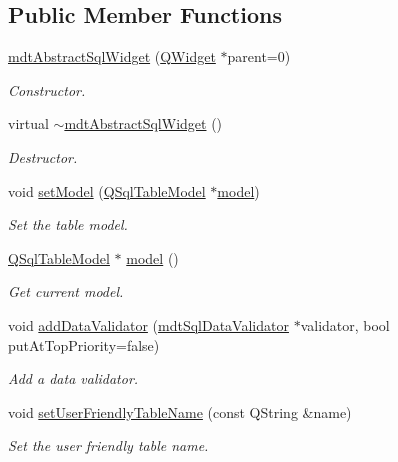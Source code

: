 \subsection*{Public Member Functions}
\begin{DoxyCompactItemize}
\item 
\hyperlink{classmdt_abstract_sql_widget_a74ef509a9487c3985fce7a4cbadbe1b3}{mdt\-Abstract\-Sql\-Widget} (\hyperlink{class_q_widget}{Q\-Widget} $\ast$parent=0)
\begin{DoxyCompactList}\small\item\em Constructor. \end{DoxyCompactList}\item 
virtual \hyperlink{classmdt_abstract_sql_widget_a46dabe9e76aaea93ff20b28863e6c0ff}{$\sim$mdt\-Abstract\-Sql\-Widget} ()
\begin{DoxyCompactList}\small\item\em Destructor. \end{DoxyCompactList}\item 
void \hyperlink{classmdt_abstract_sql_widget_a8971862741e1ef79c79e11b37e955476}{set\-Model} (\hyperlink{class_q_sql_table_model}{Q\-Sql\-Table\-Model} $\ast$\hyperlink{classmdt_abstract_sql_widget_a298d40a6540aeabbb7644e3c4fd9f3ea}{model})
\begin{DoxyCompactList}\small\item\em Set the table model. \end{DoxyCompactList}\item 
\hyperlink{class_q_sql_table_model}{Q\-Sql\-Table\-Model} $\ast$ \hyperlink{classmdt_abstract_sql_widget_a298d40a6540aeabbb7644e3c4fd9f3ea}{model} ()
\begin{DoxyCompactList}\small\item\em Get current model. \end{DoxyCompactList}\item 
void \hyperlink{classmdt_abstract_sql_widget_a0ccf93f41b1d7c479bfe0a52df2aac06}{add\-Data\-Validator} (\hyperlink{classmdt_sql_data_validator}{mdt\-Sql\-Data\-Validator} $\ast$validator, bool put\-At\-Top\-Priority=false)
\begin{DoxyCompactList}\small\item\em Add a data validator. \end{DoxyCompactList}\item 
void \hyperlink{classmdt_abstract_sql_widget_ac3fe33cfebb07d461ca06ee838a9b979}{set\-User\-Friendly\-Table\-Name} (const Q\-String \&name)
\begin{DoxyCompactList}\small\item\em Set the user friendly table name. \end{DoxyCompactList}\item 

\end{DoxyCompactItemize}
